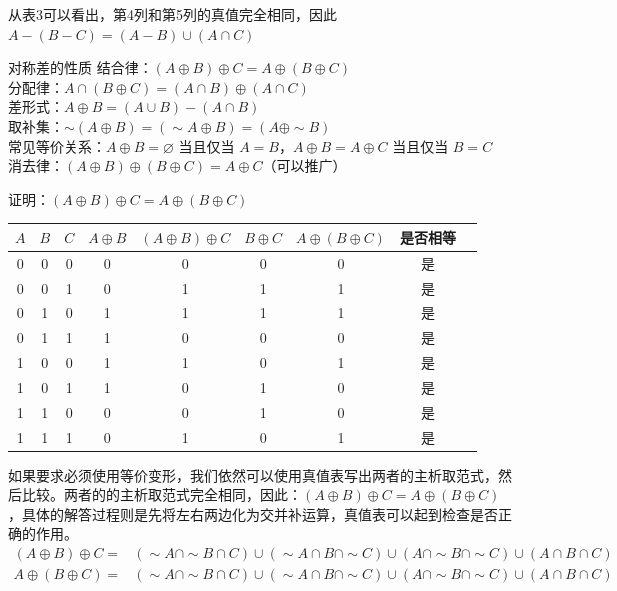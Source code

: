 \documentclass[lang=cn,11pt]{elegantbook}
\begin{document}
从表3可以看出，第4列和第5列的真值完全相同，因此$A - (B - C) = (A - B) \cup (A \cap C)$
\begin{theorem}{对称差的性质}
    结合律：$(A \oplus B) \oplus C = A \oplus (B \oplus C)$\\
    分配律：$A \cap (B \oplus C) = (A \cap B) \oplus (A \cap C)$\\
    差形式：$A \oplus B = (A \cup B) - (A \cap B)$\\
    取补集：$\sim(A \oplus B) = (\sim A \oplus B) = (A \oplus \sim B)$\\
    常见等价关系：$A \oplus B = \varnothing$ 当且仅当 $A = B$，$A \oplus B = A \oplus C$ 当且仅当 $B = C$\\
    消去律：$(A \oplus B) \oplus (B \oplus C) = A \oplus C$（可以推广）
\end{theorem}
证明：$(A \oplus B) \oplus C = A \oplus (B \oplus C)$
\begin{center}
\begin{tabular}{ccc|cccccc}
$A$ & $B$ & $C$ & $A \oplus B$ & $(A \oplus B) \oplus C$ & $B \oplus C$ & $A \oplus (B \oplus C)$ & 是否相等 \\
\hline
0 & 0 & 0 & 0 & 0 & 0 & 0 & 是 \\
0 & 0 & 1 & 0 & 1 & 1 & 1 & 是 \\
0 & 1 & 0 & 1 & 1 & 1 & 1 & 是 \\
0 & 1 & 1 & 1 & 0 & 0 & 0 & 是 \\
1 & 0 & 0 & 1 & 1 & 0 & 1 & 是 \\
1 & 0 & 1 & 1 & 0 & 1 & 0 & 是 \\
1 & 1 & 0 & 0 & 0 & 1 & 0 & 是 \\
1 & 1 & 1 & 0 & 1 & 0 & 1 & 是 \\
\end{tabular}
\end{center}
如果要求必须使用等价变形，我们依然可以使用真值表写出两者的主析取范式，然后比较。两者的的主析取范式完全相同，因此：$(A \oplus B) \oplus C = A \oplus (B \oplus C)$，具体的解答过程则是先将左右两边化为交并补运算，真值表可以起到检查是否正确的作用。
\begin{align*}
(A \oplus B) \oplus C = & (\sim A \cap \sim B \cap C) \cup 
                        (\sim A \cap B \cap \sim C) \cup (A \cap \sim B \cap \sim C) \cup 
                        (A \cap B \cap C)\\
A \oplus (B \oplus C) = & (\sim A \cap \sim B \cap C) \cup 
                         (\sim A \cap B \cap \sim C) \cup 
                         (A \cap \sim B \cap \sim C) \cup 
                         (A \cap B \cap C)
\end{align*}
\end{document}
